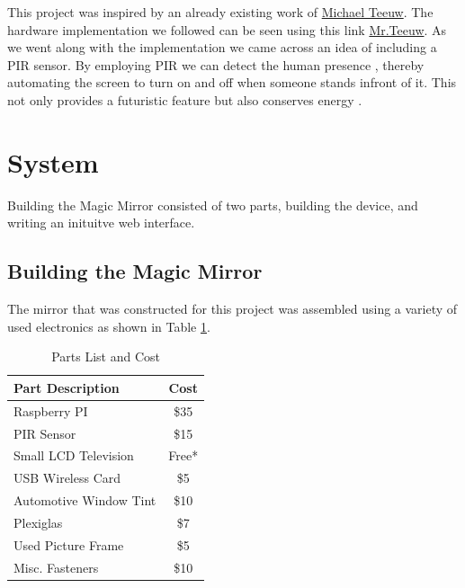 \documentclass[conference]{IEEEtran}
\begin{document}
This project was inspired by an already existing work of \href{http://michaelteeuw.nl/}{Michael Teeuw}. The hardware implementation we followed can be seen using this link \href{http://michaelteeuw.nl/post/80391333672/magic-mirror-part-i-the-idea-the-mirror}{Mr.Teeuw}. As we went along with the implementation we came across an idea of including a PIR sensor. By employing PIR we can detect the human presence , thereby automating the screen to turn on and off when someone stands infront of it. This not only provides a futuristic feature but also conserves energy . 



\section{System} 
Building the Magic Mirror consisted of two parts, building the device, and writing an inituitve web interface.
\subsection{Building the Magic Mirror}
The mirror that was constructed for this project was assembled using a variety of used electronics as shown in Table \ref{tab:cost}.


\begin{table}[!t]
\renewcommand{\arraystretch}{1.3}
\caption{Parts List and Cost}
\label{tab:cost}
\centering
\begin{tabular}{|l||c|}
\hline
Part Description & Cost\\
\hline
\hline
Raspberry PI & \$35\\
\hline
PIR Sensor & \$15\\
\hline
Small LCD Television & Free*\\
\hline
USB Wireless Card & \$5\\
\hline
Automotive Window Tint & \$10\\
\hline
Plexiglas & \$7\\
\hline
Used Picture Frame & \$5\\
\hline
Misc. Fasteners & \$10\\
\hline
\end{tabular}
\end{table}
\end{document}
